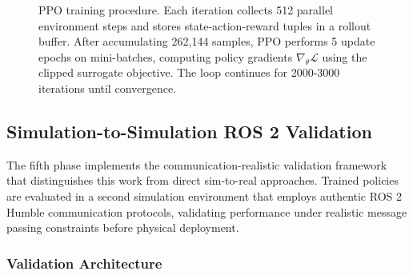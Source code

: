\documentclass[12pt,a4paper]{article}
\begin{document}
\begin{figure}[H]
\caption[PPO training procedure]{PPO training procedure. Each iteration collects 512 parallel environment steps and stores state-action-reward tuples in a rollout buffer. After accumulating 262,144 samples, PPO performs 5 update epochs on mini-batches, computing policy gradients $\nabla_\theta \mathcal{L}$ using the clipped surrogate objective. The loop continues for 2000-3000 iterations until convergence.}
\label{fig:training_procedure}
\end{figure}

\subsection{Simulation-to-Simulation ROS 2 Validation}

The fifth phase implements the communication-realistic validation framework that distinguishes this work from direct sim-to-real approaches. Trained policies are evaluated in a second simulation environment that employs authentic ROS 2 Humble communication protocols, validating performance under realistic message passing constraints before physical deployment.

\subsubsection{Validation Architecture}
\end{document}

